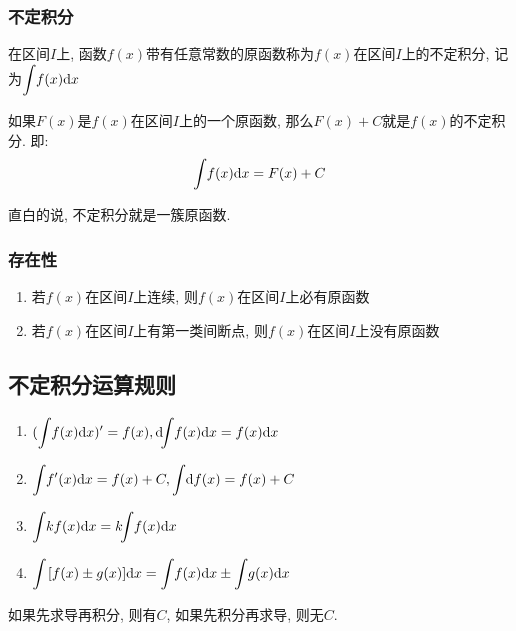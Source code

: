 \subsubsection{不定积分}
在区间$ I $上, 函数$ f(x) $带有任意常数的原函数称为$ f(x) $在区间$ I $上的不定积分, 记为$ \displaystyle \int_{}\hspace{.2em} f(x)\mathrm{d}x $ \par 如果$ F(x) $是$ f(x) $在区间$ I $上的一个原函数, 那么$ F(x)+C $就是$ f(x) $的不定积分. 即:
\begin{equation*}
\displaystyle\int_{}\hspace{.2em} f(x)\mathrm{d}x =F(x)+C
\end{equation*}\par
直白的说, 不定积分就是一簇原函数.
\subsubsection{存在性}
\begin{enumerate}
\item 若$ f(x) $在区间$ I $上连续, 则$ f(x) $在区间$ I $上必有原函数
\item 若$ f(x) $在区间$ I $上有第一类间断点, 则$ f(x)
 $在区间$ I $上没有原函数
\end{enumerate}
\subsection{不定积分运算规则}
\begin{enumerate}
\item $ (\displaystyle\int_{}\hspace{.2em} f(x)\mathrm{d}x)'=f(x), \mathrm{d}\hspace{-.35em}\displaystyle\int_{}\hspace{.2em} f(x)\mathrm{d}x=f(x)\mathrm{d}x $
\item $ \displaystyle\int_{}\hspace{.2em} f'(x)\mathrm{d}x=f(x)+C, \displaystyle\int_{}\hspace{.2em} \mathrm{d}f(x)=f(x)+C $
\item $ \displaystyle\int_{}\hspace{.2em} kf(x)\mathrm{d}x=k\hspace{-.35em}\displaystyle\int_{}\hspace{.2em} f(x)\mathrm{d}x $
\item $ \displaystyle\int_{}\hspace{.5em} [f(x)\pm g(x)]\mathrm{d}x=\displaystyle\int_{}\hspace{.2em} f(x)\mathrm{d}x\pm \displaystyle\int_{}\hspace{.2em} g(x)\mathrm{d}x $
\end{enumerate}\par
如果先求导再积分, 则有$ C $, 如果先积分再求导, 则无$ C $.
